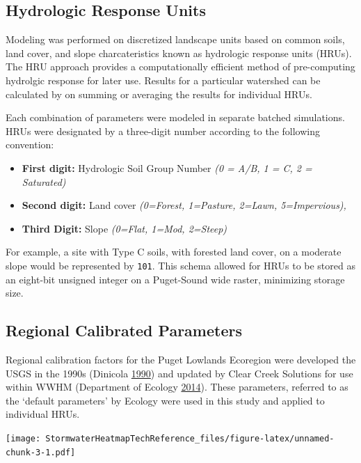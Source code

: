 \documentclass[
]{report}
\providecommand{\tightlist}{%
  \setlength{\itemsep}{0pt}\setlength{\parskip}{0pt}}
\begin{document}
\hypertarget{hydrologic-response-units}{%
\subsection{Hydrologic Response Units}\label{hydrologic-response-units}}

Modeling was performed on discretized landscape units based on common soils, land cover, and slope charcateristics known as hydrologic response units (HRUs). The HRU approach provides a computationally efficient method of pre-computing hydrolgic response for later use. Results for a particular watershed can be calculated by on summing or averaging the results for individual HRUs.

Each combination of parameters were modeled in separate batched simulations. HRUs were designated by a three-digit number according to the following convention:

\begin{itemize}
\tightlist
\item
  \textbf{First digit:} Hydrologic Soil Group Number \emph{(0 = A/B, 1 = C, 2 = Saturated)}
\item
  \textbf{Second digit:} Land cover \emph{(0=Forest, 1=Pasture, 2=Lawn, 5=Impervious),}
\item
  \textbf{Third Digit:} Slope \emph{(0=Flat, 1=Mod, 2=Steep)}
\end{itemize}

For example, a site with Type C soils, with forested land cover, on a moderate slope would be represented by \texttt{101}. This schema allowed for HRUs to be stored as an eight-bit unsigned integer on a Puget-Sound wide raster, minimizing storage size.

\hypertarget{regional-calibrated-parameters}{%
\subsection{Regional Calibrated Parameters}\label{regional-calibrated-parameters}}

Regional calibration factors for the Puget Lowlands Ecoregion were developed the USGS in the 1990s (Dinicola \protect\hyperlink{ref-Dinicola1990}{1990}) and updated by Clear Creek Solutions for use within WWHM (Department of Ecology \protect\hyperlink{ref-DepartmentofEcology2014}{2014}). These parameters, referred to as the `default parameters' by Ecology were used in this study and applied to individual HRUs.

\texttt{[image: StormwaterHeatmapTechReference\_files/figure-latex/unnamed-chunk-3-1.pdf]}
\end{document}
